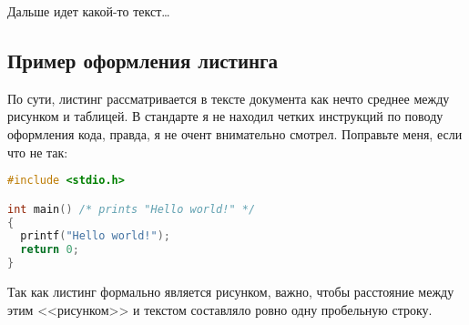 Дальше идет какой-то текст\dots

\newpage

\subsection{Пример оформления листинга}

По сути, листинг рассматривается в тексте документа как нечто среднее между рисунком и таблицей.
В стандарте я не находил четких инструкций по поводу оформления кода, правда, я не очент внимательно смотрел.
Поправьте меня, если что не так: 

    \begin{lstlisting}[language=c,caption=\mbox{Исходный код какой-то программы на C}]
#include <stdio.h>

int main() /* prints "Hello world!" */
{ 
  printf("Hello world!"); 
  return 0;
}
    \end{lstlisting}

Так как листинг формально является рисунком, важно, чтобы расстояние
между этим <<рисунком>> и текстом составляло ровно одну пробельную строку.


\newpage
